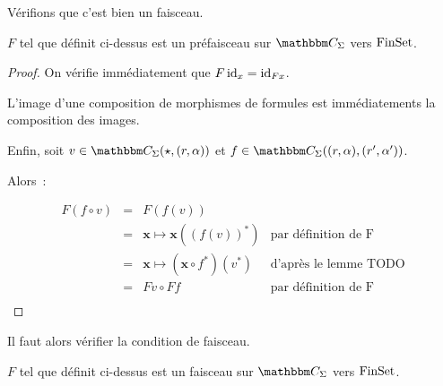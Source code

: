 Vérifions que c'est bien un faisceau.

\begin{lem}
    $F$ tel que définit ci-dessus est un préfaisceau sur $\C_\Sigma$ vers $\text{FinSet}$.
\end{lem}

\begin{proof}
    On vérifie immédiatement que $F\operatorname{id}_x = \operatorname{id}_{Fx}$.

    L'image d'une composition de morphismes de formules est immédiatements la composition
    des images.

    Enfin, soit $v\in\C_\Sigma(\star, (r,\alpha))$ et
    $f\in\C_\Sigma((r,\alpha), (r',\alpha'))$.

    Alors~:
    
    \[\begin{array}{rcll}
        F(f\circ v) & = & F(f(v)) & \\
                    & = & \mathbf{x}\mapsto \mathbf{x}((f(v))^*) 
                            & \text{par définition de F} \\
                    & = & \mathbf{x}\mapsto (\mathbf{x}\circ f^*)(v^*)
                            & \text{d'après le lemme TODO} \\
                    & = & Fv \circ Ff & \text{par définition de F} \\
    \end{array}\]
\end{proof}

Il faut alors vérifier la condition de faisceau.

\begin{lem}
    $F$ tel que définit ci-dessus est un faisceau sur $\C_\Sigma$ vers $\text{FinSet}$.
\end{lem}

